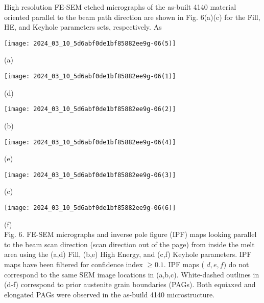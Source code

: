 \documentclass[10pt]{article}
\begin{document}
High resolution FE-SEM etched micrographs of the as-built 4140 material oriented parallel to the beam path direction are shown in Fig. 6(a)(c) for the Fill, HE, and Keyhole parameters sets, respectively. As

\begin{center}
\texttt{[image: 2024\_03\_10\_5d6abf0de1bf85882ee9g-06(5)]}
\end{center}

(a)

\begin{center}
\texttt{[image: 2024\_03\_10\_5d6abf0de1bf85882ee9g-06(1)]}
\end{center}

(d)

\begin{center}
\texttt{[image: 2024\_03\_10\_5d6abf0de1bf85882ee9g-06(2)]}
\end{center}

(b)

\begin{center}
\texttt{[image: 2024\_03\_10\_5d6abf0de1bf85882ee9g-06(4)]}
\end{center}

(e)

\begin{center}
\texttt{[image: 2024\_03\_10\_5d6abf0de1bf85882ee9g-06(3)]}
\end{center}

(c)

\begin{center}
\texttt{[image: 2024\_03\_10\_5d6abf0de1bf85882ee9g-06(6)]}
\end{center}

(f)\\
Fig. 6. FE-SEM micrographs and inverse pole figure (IPF) maps looking parallel to the beam scan direction (scan direction out of the page) from inside the melt area using the (a,d) Fill, (b,e) High Energy, and (c,f) Keyhole parameters. IPF maps have been filtered for confidence index $\geq 0.1$. IPF maps ( $d, e, f)$ do not correspond to the same SEM image locations in (a,b,c). White-dashed outlines in (d-f) correspond to prior austenite grain boundaries (PAGs). Both equiaxed and elongated PAGs were observed in the as-build 4140 microstructure.
\end{document}
